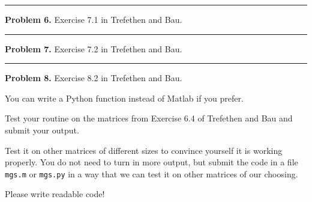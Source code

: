 \documentclass[10pt]{article}
\begin{document}
\vskip 1cm
\hrule
{\bf Problem 6.}
Exercise 7.1 in Trefethen and Bau.




\vskip 1cm
\hrule
{\bf Problem 7.}
Exercise 7.2 in Trefethen and Bau.




\vskip 1cm
\hrule
{\bf Problem 8.}
Exercise 8.2 in Trefethen and Bau.

You can write a Python function instead of Matlab if you prefer.

Test your routine on the matrices from Exercise 6.4 of Trefethen and Bau
and submit your output.

Test it on other matrices of different sizes to convince yourself it is
working properly. You do not need to turn in more output, but submit the
code in a file {\tt mgs.m} or {\tt mgs.py} in a way that we can test it on other
matrices of our choosing.

Please write readable code!



\end{document}
